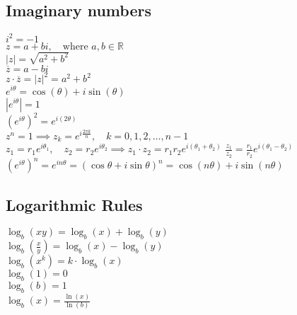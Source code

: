 \documentclass[a4paper,7pt,fleqn]{article}
\begin{document}
\begin{multicols}{3}
\begin{minipage}{\linewidth}
\end{minipage}
\begin{minipage}{\linewidth}

\subsection{Imaginary numbers}

\( i^2 = -1 \) \\ 
\( z = a + bi, \quad \text{where } a, b \in \mathbb{R} \) \\
\( |z| = \sqrt{a^2 + b^2} \) \\
\( \overline{z} = a - bi \) \\
\( z \cdot \overline{z} = |z|^2 = a^2 + b^2 \) \\
\( e^{i\theta} = \cos(\theta) + i\sin(\theta) \) \\
\( |e^{i\theta}| = 1 \) \\
\( \left(e^{i\theta}\right)^2 = e^{i(2\theta)} \) \\
\( z^n = 1 \implies z_k = e^{i\frac{2\pi k}{n}}, \quad k = 0, 1, 2, \dots, n-1 \) \\
\( z_1 = r_1 e^{i\theta_1}, \quad z_2 = r_2 e^{i\theta_2} \implies
z_1 \cdot z_2 = r_1 r_2 e^{i(\theta_1 + \theta_2)} \)
\( \frac{z_1}{z_2} = \frac{r_1}{r_2} e^{i(\theta_1 - \theta_2)} \) \\
\( \left(e^{i\theta}\right)^n = e^{i n \theta} = (\cos\theta + i\sin\theta)^n = \cos(n\theta) + i\sin(n\theta) \) \\

\end{minipage}


\begin{minipage}{\linewidth}
\subsection{Logarithmic Rules}
\(\log_b(xy) = \log_b(x) + \log_b(y)\) \\ 
\(\log_b\left(\frac{x}{y}\right) = \log_b(x) - \log_b(y)\) \\
\(\log_b(x^k) = k \cdot \log_b(x)\) \\
\(\log_b(1) = 0\) \\
\(\log_b(b) = 1\) \\
\(\log_b(x) = \frac{\ln(x)}{\ln(b)}\) \\



\end{minipage}
\begin{minipage}{\linewidth}


\end{minipage}
\end{multicols}
\end{document}

